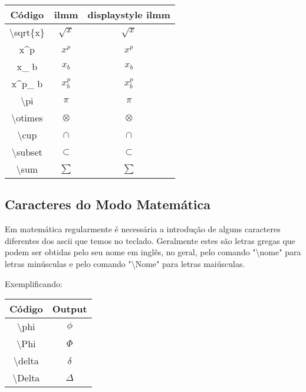 \begin{table}[ht]
\centering
\begin{tabular}{| c | c | c | }
    \hline
    Código                   & \ac{ilmm}          & displaystyle \ac{ilmm}         \\ \hline
    \textbackslash sqrt\{x\} & $\sqrt{x}$         & $\displaystyle{\sqrt{x}}$     \\ \hline
    x\textasciicircum p      & $x^{p}$            & $\displaystyle{x^{p}}$      \\ \hline
    x\_ b                       & $x_{b}$            & $\displaystyle{x_b}$           \\ \hline
    x\textasciicircum p\_ b  & $x_b^{p}$        & $\displaystyle{x_b^{p}}$      \\ \hline
    \textbackslash pi          & $\pi$             & $\displaystyle{\pi}$          \\ \hline
    \textbackslash otimes    & $\otimes$         & $\displaystyle{\otimes}$     \\ \hline
    \textbackslash cup       & $\cap$             & $\displaystyle{\cap}$          \\ \hline
    \textbackslash subset    & $\subset$         & $\displaystyle{\subset}$     \\ \hline
    \textbackslash sum       & $\sum$             & $\displaystyle{\sum}$          \\ \hline
    \hline
\end{tabular}
\end{table}

\subsection{Caracteres do Modo Matemática}
Em matemática regularmente é necessária a introdução de alguns caracteres diferentes dos \ac{ascii} que temos no teclado. Geralmente estes são letras gregas que podem ser obtidas pelo seu nome em inglês, no geral, pelo comando "\textbackslash nome" para letras minúsculas e pelo comando "\textbackslash Nome" para letras maiúsculas.

Exemplificando:
\begin{table}[h]
\center
\begin{tabular}{|c|c|}
\hline
Código & Output \\ \hline
\textbackslash phi    & $\phi$ \\ \hline
\textbackslash Phi    & $\Phi$ \\ \hline
\textbackslash delta & $\delta$ \\ \hline
\textbackslash Delta & $\Delta$ \\ \hline
\end{tabular}
\end{table}

